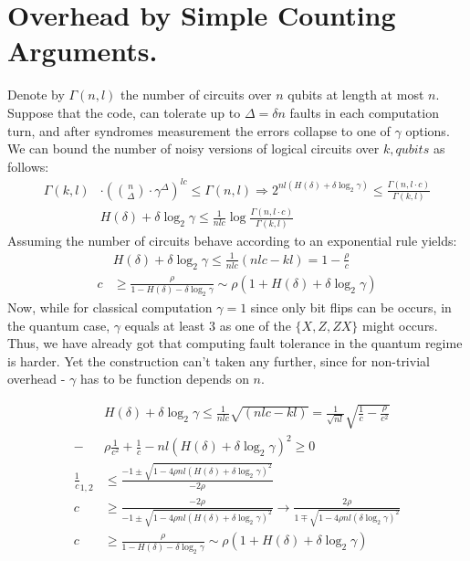 \documentclass[manuscript,screen,review]{acmart}
\begin{document}
{\section{Overhead by Simple Counting Arguments.} 
Denote by $\Gamma(n,l)$ the number of circuits over $n$ qubits at length at most $n$. Suppose that the code, can tolerate up to $\Delta = \delta n $ faults in each computation turn, and after syndromes measurement the errors collapse to one of $\gamma$ options.  We can bound the number of noisy versions of logical circuits over $k, qubits$ as follows: 
\begin{equation*}
  \begin{split}
    \Gamma(k,l) & \cdot \left( { n \choose \Delta  } \cdot \gamma^{\Delta} \right)^{lc} \le \Gamma(n,l)    \Rightarrow  2^{  nl \left( H(\delta) +  \delta\log_{2}\gamma \right)  } \le \frac{\Gamma(n,l\cdot c)}{\Gamma(k,l)} \\
    &H(\delta) +  \delta\log_{2}\gamma \le \frac{1}{nlc} \log  \frac{\Gamma(n,l\cdot c)}{\Gamma(k,l)}
  \end{split}
\end{equation*}
Assuming the number of circuits behave according to an exponential rule yields: 
\begin{equation*}
  \begin{split}
    &H(\delta) +  \delta\log_{2}\gamma \le \frac{1}{nlc} \left( nlc - kl\right) = 1 - \frac{\rho}{c}  \\ 
    c & \ge  \frac{\rho}{ 1 -  H(\delta) - \delta\log_{2}\gamma } \sim \rho \left( 1 + H(\delta) + \delta\log_{2}\gamma \right)
  \end{split}
\end{equation*}
Now, while for classical computation $\gamma = 1 $ since only bit flips can be occurs, in the quantum case, $\gamma$ equals at least $3$ as one of the $\{ X, Z, ZX \} $ might occurs. Thus, we have already got that computing fault tolerance in the quantum regime is harder. Yet the construction can't taken any further, since for non-trivial overhead - $\gamma$ has to be function depends on $n$.  

\begin{equation*}
  \begin{split}
    &H(\delta) +  \delta\log_{2}\gamma \le \frac{1}{nlc} \sqrt{\left( nlc - kl\right)} = \frac{1}{\sqrt{nl} }\sqrt{ \frac{1}{c} - \frac{\rho}{c^2} } \\ 
    - & \rho \frac{1}{c^2} + \frac{1}{c} - nl\left( H(\delta) +  \delta\log_{2}\gamma\right)^{2} \ge 0  \\ 
    \frac{1}{c}_{1,2} & \le \frac{ - 1 \pm \sqrt{ 1 -  4\rho  nl\left( H(\delta) +  \delta\log_{2}\gamma\right)^{2}   }   }{- 2\rho} \\ 
    c & \ge \frac{- 2\rho}{ - 1 \pm \sqrt{ 1 -  4\rho  nl\left( H(\delta) +  \delta\log_{2}\gamma\right)^{2}   }   } \rightarrow \frac{2\rho}{  1 \mp \sqrt{ 1 -  4\rho  nl\left(  \delta\log_{2}\gamma\right)^{2}   }   }\\ 
    c & \ge  \frac{\rho}{ 1 -  H(\delta) - \delta\log_{2}\gamma } \sim \rho \left( 1 + H(\delta) + \delta\log_{2}\gamma \right)
  \end{split}
\end{equation*}

}
\end{document}
